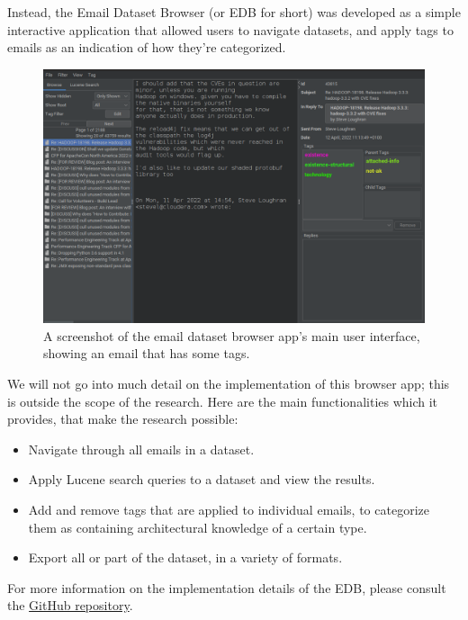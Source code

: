 \documentclass[a4paper, 12pt]{article}
\begin{document}
		Instead, the Email Dataset Browser (or EDB for short) was developed as a simple interactive application that allowed users to navigate datasets, and apply tags to emails as an indication of how they're categorized.
		
		\begin{figure}[H]
			\label{fig:edb-screenshot}
			\centering
			\includegraphics[width=\textwidth]{img/edb-screenshot.png}
			\caption{A screenshot of the email dataset browser app's main user interface, showing an email that has some tags.}
		\end{figure}
	
		We will not go into much detail on the implementation of this browser app; this is outside the scope of the research. Here are the main functionalities which it provides, that make the research possible:
		
		\begin{itemize}
			\item Navigate through all emails in a dataset.
			\item Apply Lucene search queries to a dataset and view the results.
			\item Add and remove tags that are applied to individual emails, to categorize them as containing architectural knowledge of a certain type.
			\item Export all or part of the dataset, in a variety of formats.
		\end{itemize}
	
		For more information on the implementation details of the EDB, please consult the \href{https://github.com/ArchitecturalKnowledgeAnalysis/EmailDatasetBrowser}{GitHub repository}.
	
\end{document}
